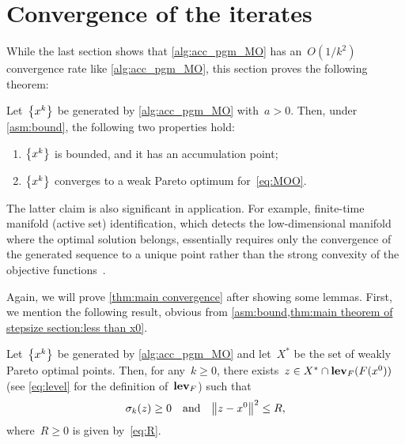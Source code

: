 \documentclass[../main]{subfiles}
\begin{document}
\section{Convergence of the iterates} \label{sec:acc_pgm:convergence}
While the last section shows that \cref{alg:acc_pgm_MO} has an~$O(1 / k^2)$ convergence rate like \cref{alg:acc_pgm_MO}, this section proves the following theorem:
\begin{theorem} \label{thm:main convergence}
    Let~$\set*{x^k}$ be generated by \cref{alg:acc_pgm_MO} with~$a > 0$.
    Then, under \cref{asm:bound}, the following two properties hold:
    \begin{enumerate}
        \item \label{thm:main convergence:bound} $\set*{x^k}$ is bounded, and it has an accumulation point;
        \item \label{thm:main convergence:Pareto} $\set*{x^k}$ converges to a weak Pareto optimum for~\cref{eq:MOO}.
    \end{enumerate}
\end{theorem}
The latter claim is also significant in application.
For example, finite-time manifold (active set) identification, which detects the low-dimensional manifold where the optimal solution belongs, essentially requires only the convergence of the generated sequence to a unique point rather than the strong convexity of the objective functions~\cite{Sun2019}.

Again, we will prove \cref{thm:main convergence} after showing some lemmas.
First, we mention the following result, obvious from \cref{asm:bound,thm:main theorem of stepsize section:less than x0}.
\begin{lemma} \label{thm:z exist}
    Let~$\set*{x^k}$ be generated by \cref{alg:acc_pgm_MO} and let~$X^\ast$ be the set of weakly Pareto optimal points.
    Then, for any~$k \ge 0$, there exists~$z \in X^\ast \cap \level_F(F(x^0))$ (see \cref{eq:level} for the definition of~$\level_F$) such that
    \[
        \sigma_k(z) \ge 0 \eqand \norm*{z - x^0}^2 \le R
    ,\] 
    where~$R \ge 0$ is given by~\cref{eq:R}.
\end{lemma}
\end{document}
